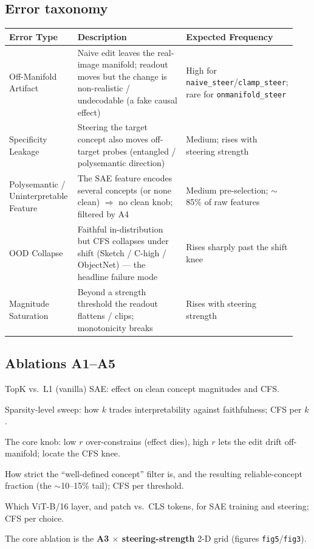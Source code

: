 \documentclass[11pt]{article}
\begin{document}
\subsection*{Error taxonomy}
\renewcommand{\arraystretch}{1.2}
\begin{center}\small
\begin{tabular}{@{}p{0.24\linewidth} p{0.46\linewidth} p{0.24\linewidth}@{}}
\toprule
\textbf{Error Type} & \textbf{Description} & \textbf{Expected Frequency}\\
\midrule
Off-Manifold Artifact & Naive edit leaves the real-image manifold; readout moves but the
  change is non-realistic / undecodable (a fake causal effect) & High for
  \texttt{naive\_steer}/\texttt{clamp\_steer}; rare for \texttt{onmanifold\_steer}\\
Specificity Leakage & Steering the target concept also moves off-target probes
  (entangled / polysemantic direction) & Medium; rises with steering strength\\
Polysemantic / Uninterpretable Feature & The SAE feature encodes several concepts (or
  none clean) $\Rightarrow$ no clean knob; filtered by A4 & Medium pre-selection;
  $\sim$85\% of raw features\\
OOD Collapse & Faithful in-distribution but CFS collapses under shift
  (Sketch / C-high / ObjectNet) --- the headline failure mode & Rises sharply past the
  shift knee\\
Magnitude Saturation & Beyond a strength threshold the readout flattens / clips;
  monotonicity breaks & Rises with steering strength\\
\bottomrule
\end{tabular}
\end{center}

\subsection*{Ablations A1--A5}
\begin{description}[leftmargin=2.6em,style=nextline,itemsep=2pt]
  \item[A1 --- SAE type] TopK vs.\ L1 (vanilla) SAE: effect on clean concept magnitudes
    and CFS.
  \item[A2 --- TopK $k$] Sparsity-level sweep: how $k$ trades interpretability against
    faithfulness; CFS per $k$.
  \item[A3 --- Projection rank $r$] The core knob: low $r$ over-constrains (effect dies),
    high $r$ lets the edit drift off-manifold; locate the CFS knee.
  \item[A4 --- Concept-selection threshold] How strict the ``well-defined concept''
    filter is, and the resulting reliable-concept fraction (the $\sim$10--15\% tail);
    CFS per threshold.
  \item[A5 --- Backbone layer \& token] Which ViT-B/16 layer, and patch vs.\ CLS tokens,
    for SAE training and steering; CFS per choice.
\end{description}
The core ablation is the \textbf{A3 $\times$ steering-strength} 2-D grid
(figures \texttt{fig5}/\texttt{fig3}).
\end{document}
